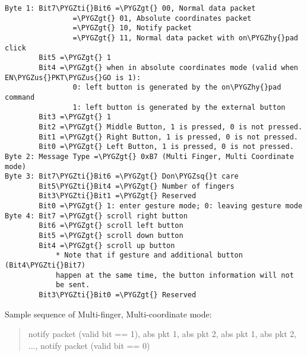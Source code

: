 \documentclass[a4paper,8pt,english]{sphinxmanual}
\def\PYGZus{\char`\_}
\def\PYGZgt{\char`\>}
\def\PYGZhy{\char`\-}
\def\PYGZsq{\char`\'}
\def\PYGZti{\char`\~}
\renewcommand\PYGZsq{\textquotesingle}
\begin{document}
\begin{Verbatim}[commandchars=\\\{\}]
Byte 1: Bit7\PYGZti{}Bit6 =\PYGZgt{} 00, Normal data packet
                =\PYGZgt{} 01, Absolute coordinates packet
                =\PYGZgt{} 10, Notify packet
                =\PYGZgt{} 11, Normal data packet with on\PYGZhy{}pad click
        Bit5 =\PYGZgt{} 1
        Bit4 =\PYGZgt{} when in absolute coordinates mode (valid when EN\PYGZus{}PKT\PYGZus{}GO is 1):
                0: left button is generated by the on\PYGZhy{}pad command
                1: left button is generated by the external button
        Bit3 =\PYGZgt{} 1
        Bit2 =\PYGZgt{} Middle Button, 1 is pressed, 0 is not pressed.
        Bit1 =\PYGZgt{} Right Button, 1 is pressed, 0 is not pressed.
        Bit0 =\PYGZgt{} Left Button, 1 is pressed, 0 is not pressed.
Byte 2: Message Type =\PYGZgt{} 0xB7 (Multi Finger, Multi Coordinate mode)
Byte 3: Bit7\PYGZti{}Bit6 =\PYGZgt{} Don\PYGZsq{}t care
        Bit5\PYGZti{}Bit4 =\PYGZgt{} Number of fingers
        Bit3\PYGZti{}Bit1 =\PYGZgt{} Reserved
        Bit0 =\PYGZgt{} 1: enter gesture mode; 0: leaving gesture mode
Byte 4: Bit7 =\PYGZgt{} scroll right button
        Bit6 =\PYGZgt{} scroll left button
        Bit5 =\PYGZgt{} scroll down button
        Bit4 =\PYGZgt{} scroll up button
            * Note that if gesture and additional button (Bit4\PYGZti{}Bit7)
            happen at the same time, the button information will not
            be sent.
        Bit3\PYGZti{}Bit0 =\PYGZgt{} Reserved
\end{Verbatim}

Sample sequence of Multi-finger, Multi-coordinate mode:
\begin{quote}

notify packet (valid bit == 1), abs pkt 1, abs pkt 2, abs pkt 1,
abs pkt 2, ..., notify packet (valid bit == 0)
\end{quote}
\end{document}
